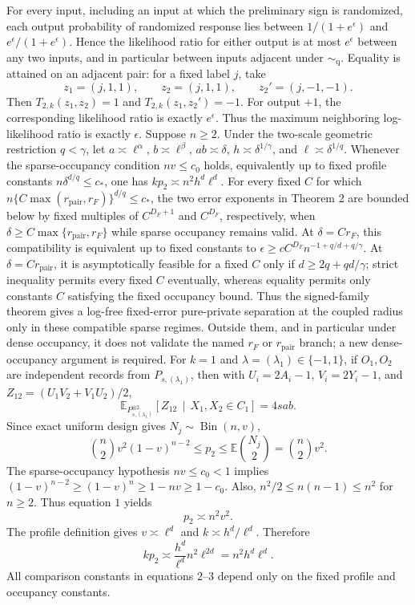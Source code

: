 For every input, including an input at which the preliminary sign is randomized, each output probability of randomized response lies between
\(1/(1+e^\epsilon)\) and \(e^\epsilon/(1+e^\epsilon)\).  Hence the likelihood ratio for either output is at most \(e^\epsilon\) between any two inputs, and in particular between inputs adjacent under \(\sim_{\mathrm q}\).  Equality is attained on an adjacent pair: for a fixed label \(j\), take
\[
 z_1=(j,1,1),
 \qquad z_2=(j,1,1),
 \qquad z_2'=(j,-1,-1).
\]
Then \(T_{2,k}(z_1,z_2)=1\) and \(T_{2,k}(z_1,z_2')=-1\).  For output \(+1\), the corresponding likelihood ratio is exactly \(e^\epsilon\).  Thus the maximum neighboring log-likelihood ratio is exactly \(\epsilon\).
Suppose \(n\ge2\). Under the two-scale geometric restriction \(q<\gamma\), let \(a\asymp\ell^\alpha\), \(b\asymp\ell^\beta\), \(ab\asymp\delta\), \(h\asymp\delta^{1/\gamma}\), and \(\ell\asymp\delta^{1/q}\). Whenever the sparse-occupancy condition \(nv\le c_0\) holds, equivalently up to fixed profile constants \(n\delta^{d/q}\le c_*\), one has \(kp_2\asymp n^2h^d\ell^d\). For every fixed \(C\) for which \(n\{C\max(r_{\mathrm{pair}},r_F)\}^{d/q}\le c_*\), the two error exponents in Theorem 2 are bounded below by fixed multiples of \(C^{D_F+1}\) and \(C^{D_F}\), respectively, when \(\delta\ge C\max\{r_{\mathrm{pair}},r_F\}\) while sparse occupancy remains valid. At \(\delta=Cr_F\), this compatibility is equivalent up to fixed constants to \(\epsilon\ge cC^{D_F}n^{-1+q/d+q/\gamma}\). At \(\delta=Cr_{\mathrm{pair}}\), it is asymptotically feasible for a fixed \(C\) only if \(d\ge2q+qd/\gamma\); strict inequality permits every fixed \(C\) eventually, whereas equality permits only constants \(C\) satisfying the fixed occupancy bound. Thus the signed-family theorem gives a log-free fixed-error pure-private separation at the coupled radius only in these compatible sparse regimes. Outside them, and in particular under dense occupancy, it does not validate the named \(r_F\) or \(r_{\mathrm{pair}}\) branch; a new dense-occupancy argument is required. For \(k=1\) and \(\lambda=(\lambda_1)\in\{-1,1\}\), if \(O_1,O_2\) are independent records from \(P_{s,(\lambda_1)}\), then with \(U_i=2A_i-1\), \(V_i=2Y_i-1\), and \(Z_{12}=(U_1V_2+V_1U_2)/2\),
\[
 \mathbb E_{P_{s,(\lambda_1)}^{\otimes2}}
 \!\left[Z_{12}\,\middle|\,X_1,X_2\in C_1\right]=4sab.
\]
Since exact uniform design gives \(N_j\sim\operatorname{Bin}(n,v)\),
\[
 \binom n2v^2(1-v)^{n-2}
 \le p_2
 \le\mathbb E\binom{N_j}{2}=\binom n2v^2. \tag{1}
\]
The sparse-occupancy hypothesis \(nv\le c_0<1\) implies
\((1-v)^{n-2}\ge(1-v)^n\ge1-nv\ge1-c_0\).  Also, \(n^2/2\le n(n-1)\le n^2\) for \(n\ge2\).  Thus equation \(1\) yields
\[
 p_2\asymp n^2v^2. \tag{2}
\]
The profile definition gives \(v\asymp\ell^d\) and \(k\asymp h^d/\ell^d\).  Therefore
\[
 kp_2\asymp
 \frac{h^d}{\ell^d}n^2\ell^{2d}
 =n^2h^d\ell^d. \tag{3}
\]
All comparison constants in equations \(2\)--\(3\) depend only on the fixed profile and occupancy constants.


